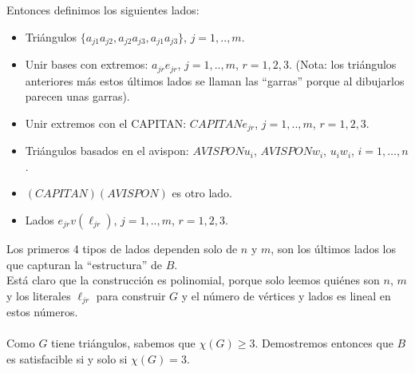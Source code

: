 \documentclass[11pt, a4paper]{article}
\theoremstyle{definition}
\begin{document}
Entonces definimos los siguientes lados:
\begin{itemize}
    \item Triángulos $\{a_{j1}a_{j2}, a_{j2}a_{j3}, a_{j1}a_{j3}\}$, $j = 1, .., m$.
    \item Unir bases con extremos: $a_{jr}e_{jr}$, $j = 1, .., m$, $r = 1, 2, 3$. (Nota: los triángulos anteriores más estos últimos lados se
    llaman las “garras” porque al dibujarlos parecen unas garras).
    \item Unir extremos con el CAPITAN: $CAPITAN e_{jr}$, $j = 1, .., m$, $r = 1, 2, 3$.
    \item Triángulos basados en el avispon: $AVISPON u_i$, $AVISPON w_i$, $u_i w_i$, $i = 1, \ldots, n$.
    \item $(CAPITAN)(AVISPON)$ es otro lado.
    \item Lados $e_{jr}v(\ell_{jr})$, $j = 1, .., m$, $r = 1, 2, 3$.
\end{itemize}
Los primeros 4 tipos de lados dependen solo de $n$ y $m$, son los últimos lados los que capturan la “estructura” de $B$.\\
Está claro que la construcción es polinomial, porque solo leemos quiénes son $n$, $m$ y los literales $\ell_{jr}$ para construir $G$ y el
número de vértices y lados es lineal en estos números.\\ \\
Como $G$ tiene triángulos, sabemos que $\chi(G) \geq 3$. Demostremos entonces que $B$ es satisfacible si y solo si $\chi(G) = 3$.
\end{document}

